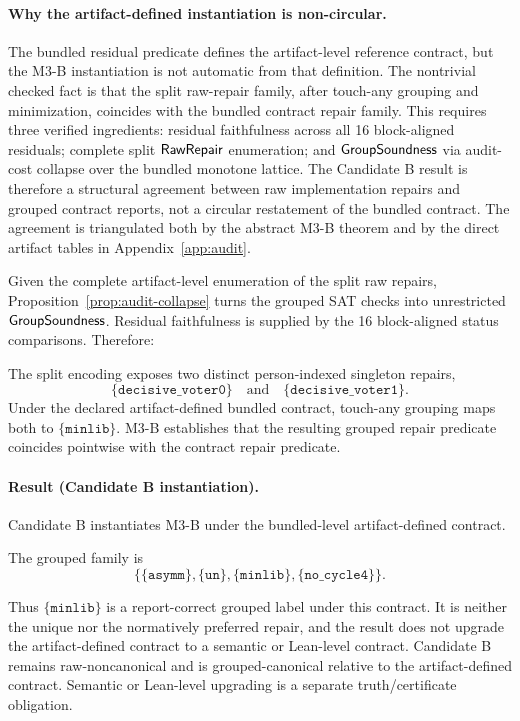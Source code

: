 \paragraph{Why the artifact-defined instantiation is non-circular.}
The bundled residual predicate defines the artifact-level reference contract,
but the M3-B instantiation is not automatic from that definition.  The
nontrivial checked fact is that the split raw-repair family, after touch-any
grouping and minimization, coincides with the bundled contract repair family.
This requires three verified ingredients: residual faithfulness across all 16
block-aligned residuals; complete split \(\mathsf{RawRepair}\) enumeration; and
\(\mathsf{GroupSoundness}\) via audit-cost collapse over the bundled monotone lattice.
The Candidate B result is therefore a structural agreement between raw
implementation repairs and grouped contract reports, not a circular restatement
of the bundled contract.  The agreement is triangulated both by the abstract
M3-B theorem and by the direct artifact tables in Appendix~\ref{app:audit}.

Given the complete artifact-level enumeration of the split raw repairs,
Proposition~\ref{prop:audit-collapse} turns the grouped SAT checks into
unrestricted \(\mathsf{GroupSoundness}\).  Residual faithfulness is supplied by the 16
block-aligned status comparisons.  Therefore:

The split encoding exposes two distinct person-indexed singleton repairs,
\[
  \{\mathtt{decisive\_voter0}\}
  \quad\text{and}\quad
  \{\mathtt{decisive\_voter1}\}.
\]
Under the declared artifact-defined bundled contract, touch-any grouping maps
both to \(\{\mathtt{minlib}\}\).  M3-B establishes that the resulting grouped
repair predicate coincides pointwise with the contract repair predicate.

\paragraph{Result (Candidate B instantiation).}
Candidate B instantiates M3-B under the bundled-level artifact-defined
contract.

The grouped family is
\[
  \bigl\{
  \{\mathtt{asymm}\},
  \{\mathtt{un}\},
  \{\mathtt{minlib}\},
  \{\mathtt{no\_cycle4}\}
  \bigr\}.
\]

Thus \(\{\mathtt{minlib}\}\) is a report-correct grouped label under this
contract.  It is neither the unique nor the normatively preferred repair, and
the result does not upgrade the artifact-defined contract to a semantic or
Lean-level contract.  Candidate B remains raw-noncanonical and is
grouped-canonical relative to the artifact-defined contract.  Semantic or
Lean-level upgrading is a separate truth/certificate obligation.
